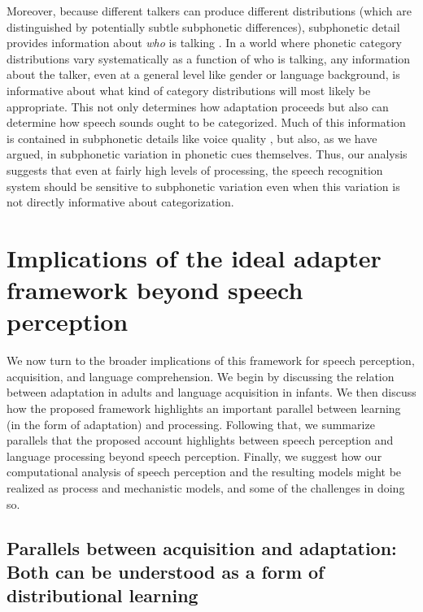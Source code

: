 Moreover, because different talkers can produce different distributions (which are distinguished by potentially subtle subphonetic differences), subphonetic detail provides information about \emph{who} is talking \cite{Creel2011,Pardo2006}.  In a world where phonetic category distributions vary systematically as a function of who is talking, any information about the talker, even at a general level like gender or language background, is informative about what kind of category distributions will most likely be appropriate.  This not only determines how adaptation proceeds but also can determine how speech sounds ought to be categorized.  Much of this information is contained in subphonetic details like voice quality \cite{Pardo2006}, but also, as we have argued, in subphonetic variation in phonetic cues themselves.  Thus, our analysis suggests that even at fairly high levels of processing, the speech recognition system should be sensitive to subphonetic variation even when this variation is not directly informative about categorization.

\label{r3-epi-abs-end}
\label{r1-epi-abs-end}

\section{Implications of the ideal adapter framework beyond speech perception}
\label{sec:general-discussion}

We now turn to the broader implications of this framework for speech perception, acquisition, and language comprehension. We begin by discussing the relation between adaptation in adults and language acquisition in infants. We then discuss how the proposed framework highlights an important parallel between learning (in the form of adaptation) and processing. Following that, we summarize parallels that the proposed account highlights between speech perception and language processing beyond speech perception.
Finally, we suggest how our computational analysis of speech perception and the resulting models might be realized as process and mechanistic models, and some of the challenges in doing so.

\subsection{Parallels between acquisition and adaptation: Both can be understood as a form of distributional learning}
\label{sec:parall-betw-proc}

